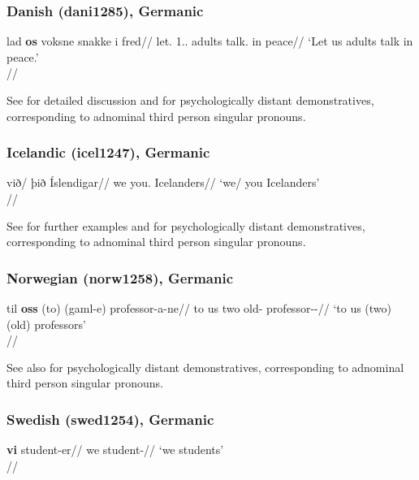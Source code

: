 \documentclass[A4paper]{article}
\begin{document}
\subsubsection{Danish (dani1285), Germanic}

\ex \begingl
\gla lad \textbf{os} voksne snakke i fred//
\glb let.\Imp{} 1.\Pl.\Acc{} adults talk.\Inf{} in peace//
\glft `Let us adults talk in peace.’\\\citep[29, (32b)]{schroeter2021}//
\endgl
\xe

See \citet{schroeter2021} for detailed discussion and \citet{johannessen2008} for psychologically distant demonstratives, corresponding to adnominal third person singular pronouns. 

\subsubsection{Icelandic (icel1247), Germanic}

\ex
\begingl
\gla við/ þið Íslendigar//
\glb we you.\Pl{} Icelanders//
\glft `we/ you Icelanders'\\\citep[11, (16a)]{sigurdssonwood2020}//
\endgl
\xe

See \citet[11f.]{sigurdssonwood2020} for further examples and \citet{johannessen2008} for psychologically distant demonstratives, corresponding to adnominal third person singular pronouns. 

\subsubsection{Norwegian (norw1258), Germanic}

\ex 
\begingl
\gla til \textbf{oss} (to) (gaml-e) professor-a-ne//
\glb to us two old-\Def{} professor-\Pl-\Def{}// 
\glft `to us (two) (old) professors' \\\citep[129, (4.36)]{julien2005}//
\endgl
\xe

See also \citet{johannessen2008} for psychologically distant demonstratives, corresponding to adnominal third person singular pronouns. 

\subsubsection{Swedish (swed1254), Germanic}

\ex 
\begingl
\gla \textbf{vi} student-er//
\glb we student-\Pl{}//
\glft `we students'\\\citep[128, fn. 18, (ia)]{julien2005}//
\endgl
\xe
\end{document}
